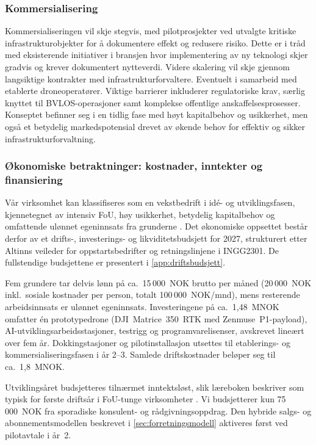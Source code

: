 \subsubsection{Kommersialisering}
Kommersialiseringen vil skje stegvis, med pilotprosjekter ved utvalgte kritiske infrastrukturobjekter for å dokumentere effekt og redusere risiko. Dette er i tråd med eksisterende initiativer i bransjen hvor implementering av ny teknologi skjer gradvis og krever dokumentert nytteverdi. Videre skalering vil skje gjennom langsiktige kontrakter med infrastrukturforvaltere. Eventuelt i samarbeid med etablerte droneoperatører. Viktige barrierer inkluderer regulatoriske krav, særlig knyttet til BVLOS-operasjoner samt komplekse offentlige anskaffelsesprosesser. Konseptet befinner seg i en tidlig fase med høyt kapitalbehov og usikkerhet, men også et betydelig markedspotensial drevet av økende behov for effektiv og sikker infrastrukturforvaltning.

\subsubsection{Økonomiske betraktninger: kostnader, inntekter og finansiering}
\label{sec:okonomi}

Vår virksomhet kan klassifiseres som en vekstbedrift i idé- og utviklingsfasen, kjennetegnet av intensiv FoU, høy usikkerhet, betydelig kapitalbehov og omfattende ulønnet egeninnsats fra grunderne \parencite{torvatn_teknologiledelse_2024}. Det
økonomiske oppsettet består derfor av et drifts-, investerings- og likviditetsbudsjett for 2027, strukturert etter Altinns veileder for oppstartsbedrifter \parencite{altinn_budsjett} og retningslinjene i INGG2301. De fullstendige budsjettene er presentert i \cref{app:driftsbudsjett}.

Fem grundere tar delvis lønn på ca.\ 15\,000~NOK brutto per måned (20\,000~NOK inkl.\ sosiale kostnader per person, totalt 100\,000~NOK/mnd), mens resterende arbeidsinnsats er ulønnet egeninnsats. Investeringene på ca.\ 1,48~MNOK omfatter én prototypedrone (DJI~Matrice~350~RTK med Zenmuse~P1-payload), AI-utviklingsarbeidsstasjoner, testrigg og programvarelisenser, avskrevet lineært over fem år. Dokkingstasjoner og pilotinstallasjon utsettes til etablerings- og kommersialiseringsfasen i år 2--3. Samlede driftskostnader beløper seg til ca.\ 1,8~MNOK.

Utviklingsåret budsjetteres tilnærmet inntektsløst, slik læreboken beskriver som typisk for første driftsår i FoU-tunge virksomheter \parencite{torvatn_teknologiledelse_2024}. Vi budsjetterer kun 75\,000~NOK fra sporadiske konsulent- og rådgivningsoppdrag. Den hybride salgs- og abonnementsmodellen beskrevet i \cref{sec:forretningsmodell} aktiveres først ved pilotavtale i år~2.

